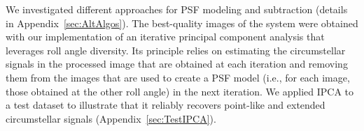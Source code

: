 \documentclass[longauth]{aa}
\newcommand{\new}[1]{#1}
\begin{document}

    We investigated different approaches for PSF modeling and subtraction (details in Appendix~\ref{sec:AltAlgos}). %
    The best-quality images of the system \new{were obtained with} our implementation of an iterative principal component analysis \citep[IPCA; e.g.,][]{Pairet2021, Stapper2022} that leverages roll angle diversity. Its principle relies on estimating the circumstellar signals in the processed image that are obtained at each iteration and removing them from the %
    images that are used to create a PSF model (i.e., for each image, those obtained at the other roll angle) in the next iteration.
    \new{We applied IPCA to a test dataset to illustrate that it reliably recovers point-like and extended circumstellar signals (Appendix~\ref{sec:TestIPCA}).}
\end{document}
